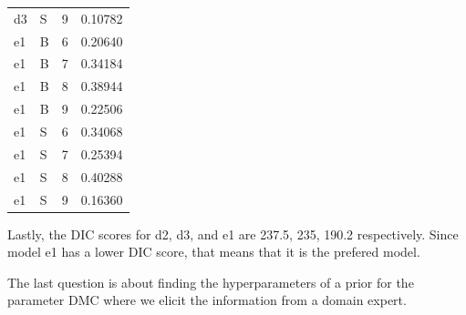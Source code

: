 \documentclass[12pt,a4paper]{article}
\begin{document}
\begin{enumerate}[(a)]
\begin{table}
\begin{tabular}{|l|lll|}
d3                         & S      & 9     & 0.10782                                            \\
e1                         & B      & 6     & 0.20640                                            \\
e1                         & B      & 7     & 0.34184                                            \\
e1                         & B      & 8     & 0.38944                                            \\
e1                         & B      & 9     & 0.22506                                            \\
e1                         & S      & 6     & 0.34068                                            \\
e1                         & S      & 7     & 0.25394                                            \\
e1                         & S      & 8     & 0.40288                                            \\
e1                         & S      & 9     & 0.16360                                            \\
\hline
\end{tabular}
\end{table}

Lastly, the DIC scores for d2, d3, and e1 are 237.5, 235, 190.2 respectively. Since model e1 has a lower DIC score, that means that it is the prefered model.

The last question is about finding the hyperparameters of a prior for the parameter DMC where we elicit the information from a domain expert. 
\end{enumerate}
\end{document}
